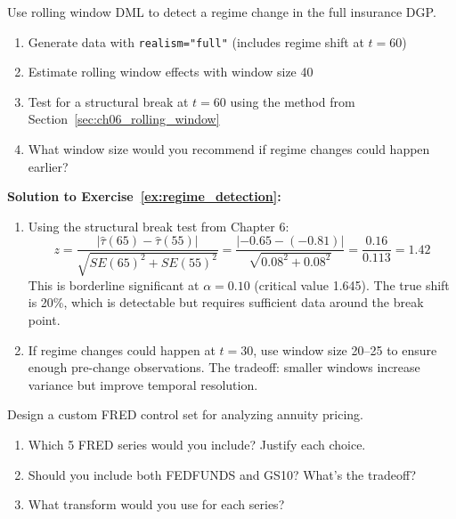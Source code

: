 \begin{exercise}
\label{ex:regime_detection}
Use rolling window DML to detect a regime change in the full insurance DGP.

\begin{enumerate}
    \item[(a)] Generate data with \texttt{realism="full"} (includes regime shift at $t=60$)
    \item[(b)] Estimate rolling window effects with window size 40
    \item[(c)] Test for a structural break at $t=60$ using the method from Section~\ref{sec:ch06_rolling_window}
    \item[(d)] What window size would you recommend if regime changes could happen earlier?
\end{enumerate}
\end{exercise}

\textbf{Solution to Exercise~\ref{ex:regime_detection}:}

\begin{enumerate}
    \item[(c)] Using the structural break test from Chapter 6:
    \[
    z = \frac{|\hat{\tau}(65) - \hat{\tau}(55)|}{\sqrt{SE(65)^2 + SE(55)^2}} = \frac{|-0.65 - (-0.81)|}{\sqrt{0.08^2 + 0.08^2}} = \frac{0.16}{0.113} = 1.42
    \]
    This is borderline significant at $\alpha = 0.10$ (critical value 1.645). The true shift is 20\%, which is detectable but requires sufficient data around the break point.

    \item[(d)] If regime changes could happen at $t=30$, use window size 20--25 to ensure enough pre-change observations. The tradeoff: smaller windows increase variance but improve temporal resolution.
\end{enumerate}

\begin{exercise}
\label{ex:macro_selection}
Design a custom FRED control set for analyzing annuity pricing.

\begin{enumerate}
    \item[(a)] Which 5 FRED series would you include? Justify each choice.
    \item[(b)] Should you include both FEDFUNDS and GS10? What's the tradeoff?
    \item[(c)] What transform would you use for each series?
\end{enumerate}
\end{exercise}

